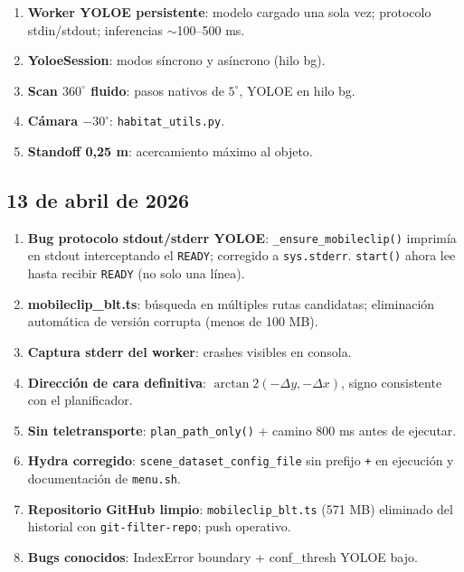 \documentclass[11pt,a4paper]{article}
\begin{document}
\begin{enumerate}
  \item \textbf{Worker YOLOE persistente}: modelo cargado una sola vez; protocolo
        stdin/stdout; inferencias $\sim$100--500 ms.
  \item \textbf{YoloeSession}: modos síncrono y asíncrono (hilo bg).
  \item \textbf{Scan $360^\circ$ fluido}: pasos nativos de $5^\circ$, YOLOE en hilo bg.
  \item \textbf{Cámara $-30^\circ$}: \texttt{habitat\_utils.py}.
  \item \textbf{Standoff 0,25 m}: acercamiento máximo al objeto.
\end{enumerate}

\subsection*{13 de abril de 2026}

\begin{enumerate}
  \item \textbf{Bug protocolo stdout/stderr YOLOE}: \texttt{\_ensure\_mobileclip()} imprimía
        en stdout interceptando el \texttt{READY}; corregido a \texttt{sys.stderr}.
        \texttt{start()} ahora lee hasta recibir \texttt{READY} (no solo una línea).
  \item \textbf{mobileclip\_blt.ts}: búsqueda en múltiples rutas candidatas;
        eliminación automática de versión corrupta (menos de 100 MB).
  \item \textbf{Captura stderr del worker}: crashes visibles en consola.
  \item \textbf{Dirección de cara definitiva}: $\arctan2(-\Delta y, -\Delta x)$,
        signo consistente con el planificador.
  \item \textbf{Sin teletransporte}: \texttt{plan\_path\_only()} + camino 800 ms antes
        de ejecutar.
  \item \textbf{Hydra corregido}: \texttt{scene\_dataset\_config\_file} sin prefijo
        \texttt{+} en ejecución y documentación de \texttt{menu.sh}.
  \item \textbf{Repositorio GitHub limpio}: \texttt{mobileclip\_blt.ts} (571 MB)
        eliminado del historial con \texttt{git-filter-repo}; push operativo.
  \item \textbf{Bugs conocidos}: IndexError boundary + conf\_thresh YOLOE bajo.
\end{enumerate}

\end{document}
